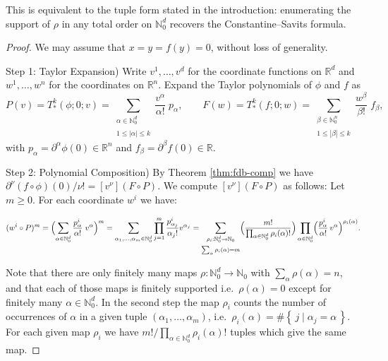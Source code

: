 \documentclass[10pt,a4paper]{article}
\theoremstyle{plain}
\theoremstyle{definition}
\newcommand{\IR}{\mathbb{R}} %
\newcommand{\IN}{\mathbb{N}} %
\newcommand{\del}{\partial} %
\newcommand{\1}{\mathbb{1}} %
\newcommand{\Set}[2]{\left\{\, #1 \;\vert\; #2 \,\right\}} %
\newcommand{\ra}{\rightarrow} %
\newcommand{\ssum}[1]{\sum_{\substack{#1}}} %
\begin{document}
This is equivalent to the tuple form stated in the introduction:
enumerating the support of \(\rho\) in any total order on \(\IN_0^d\)
recovers the Constantine--Savits formula.

\begin{proof}

We may assume that \(x = y = f(y) = 0\), without loss of generality.

Step 1: Taylor Expansion) Write \(v^1,\dots,v^d\) for the coordinate
functions on \(\IR^d\) and \(w^1,\dots,w^n\) for the coordinates on
\(\IR^n\). Expand the Taylor polynomials of \(\phi\) and \(f\) as \[
  P(v) = T_{\ast}^k(\phi; 0; v) = \ssum{\alpha \in \IN_0^d \\\\ 1 \leq |\alpha| \leq k} \frac{v^\alpha}{\alpha!} \; p_\alpha,
  \qquad
  F(w) = T_{\ast}^k(f; 0; w) = \ssum{\beta \in \IN_0^n \\\\ 1\leq |\beta| \leq k} \frac{w^\beta}{\beta!} \; f_\beta,
\] with \(p_\alpha = \del^\alpha \phi(0) \in \IR^n\) and
\(f_\beta = \del^\beta f(0) \in \IR\).

Step 2: Polynomial Composition) By Theorem \ref{thm:fdb-comp} we have
\(\del^\nu (f \circ \phi)(0)/\nu! = [v^\nu](F \circ P)\). We compute
\([v^\nu](F \circ P)\) as follows: Let \(m \geq 0\). For each coordinate
\(w^i\) we have:

\[
(w^i\circ P)^{m}
=
  \Bigl(\sum_{\alpha \in \IN_0^d}
  \frac{p_\alpha^i}{\alpha!}\; v^\alpha\Bigr)^{m}
=
  \sum_{\alpha_1,\dots,\alpha_m \in \IN_0^d}
  \prod_{j=1}^m
  \frac{p_{\alpha_j}^i}{\alpha_j!} v^{\alpha_j}
=
  \ssum{\rho_i:\IN_0^d \ra \IN_0 \\\\ \sum_\alpha \rho_i(\alpha) = m}
  \Bigl(\frac{m!}{\prod_{\alpha \in \IN_0^d} \rho_i(\alpha)!} \Bigr)
  \prod_{\alpha\in \IN_0^d}
  \Bigl(\frac{p_\alpha^i}{\alpha!}\,v^\alpha\Bigr)^{\rho_i(\alpha)}.
\]

Note that there are only finitely many maps \(\rho:\IN_0^d \ra \IN_0\)
with \(\sum_\alpha \rho(\alpha) = n\), and that each of those maps is
finitely supported i.e.~\(\rho(\alpha) = 0\) except for finitely many
\(\alpha \in \IN_0^{d}\). In the second step the map \(\rho_i\) counts
the number of occurrences of \(\alpha\) in a given tuple
\((\alpha_1,\dots,\alpha_m)\),
i.e.~\(\rho_i(\alpha) = \# \Set{j}{\alpha_j = \alpha}\). For each given
map \(\rho_i\) we have \(m!/\prod_{\alpha \in \IN_0^d} \rho_i(\alpha)!\)
tuples which give the same map.


\end{proof}
\end{document}
